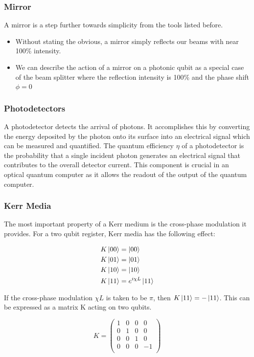 \subsubsection{Mirror}
A mirror is a step further towards simplicity from the tools listed before.
\begin{itemize}
    \item Without stating the obvious, a mirror simply reflects our beams with near 100\% intensity.

    \item We can describe the action of a mirror on a photonic qubit as a special case of the beam splitter where the reflection intensity is 100\% and the phase shift $\phi = 0$
\end{itemize}
\subsubsection{Photodetectors}
A photodetector detects the arrival of photons. It accomplishes this by converting the energy deposited by the photon onto its surface into an electrical signal which can be measured and quantified. The quantum efficiency $\eta$ of a photodetector is the probability that a single incident photon generates an electrical signal that contributes to the overall detector current. This component is crucial in an optical quantum computer as it allows the readout of the output of the quantum computer. 


\subsubsection{Kerr Media}

The most important property of a Kerr medium is the cross-phase modulation it provides. For a two qubit register, Kerr media has the following effect:

\begin{align*} 
    K \ket{00} &=  \ket{00}\\
    K \ket{01} &=  \ket{01}\\
    K \ket{10} &=  \ket{10}\\
    K \ket{11} &=  e^{i\chi L}\ket{11}
    \end{align*}
    
If the cross-phase modulation $\chi L$ is taken to be $\pi$, then $K \ket{11} =  -\ket{11}$. This can be expressed as a matrix K acting on two qubits.

$$K = \begin{pmatrix}
    1 & 0 & 0 & 0\\
    0 & 1 & 0 & 0\\
    0 & 0 & 1 & 0\\
    0 & 0 & 0 & -1\\
    \end{pmatrix}$$

